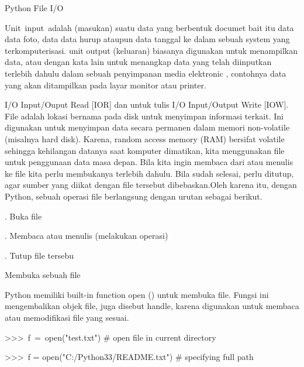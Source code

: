 \sloppy
\begin{center}{\fontsize{14pt}{14pt}\selectfont Python File I/O \\}\end{center} \par
Unit~input~adalah (masukan) suatu  data yang berbentuk documet bait itu data data foto, data data hurup ataupun data tanggal ke dalam sebuah system yang  terkomputerisasi.  unit output (keluaran) biasanya digunakan untuk menampilkan data, atau dengan kata lain untuk menangkap data yang telah diinputkan terlebih dahulu dalam sebuah penyimpanan media elektronic , contohnya data yang akan ditampilkan pada layar monitor atau printer. \par
I/O Input/Ouput Read [IOR] dan untuk tulis I/O Input/Output Write [IOW]. File adalah lokasi bernama pada disk untuk menyimpan informasi terkait. Ini digunakan untuk menyimpan data secara permanen dalam memori non-volatile (misalnya hard disk). Karena, random access memory (RAM) bersifat volatile sehingga kehilangan datanya saat komputer dimatikan, kita menggunakan file untuk penggunaan data masa depan. Bila kita ingin membaca dari atau menulis ke file kita perlu membukanya terlebih dahulu. Bila sudah selesai, perlu ditutup, agar sumber yang diikat dengan file tersebut dibebaskan.Oleh karena itu, dengan Python, sebuah operasi file berlangsung dengan urutan sebagai berikut. \par
\vspace{12pt}
. \hspace*{0.5in} Buka file \par
{}. \hspace*{0.5in} Membaca atau menulis (melakukan operasi) \par
{}. \hspace*{0.5in} Tutup file tersebu \par
\vspace{12pt}
\vspace{12pt}
\vspace{12pt}
\noindent 
Membuka sebuah file \par
\noindent 
Python memiliki built-in function open () untuk membuka file. Fungsi ini mengembalikan objek file, juga disebut handle, karena digunakan untuk membaca atau memodifikasi file yang sesuai. \par
\vspace{12pt}
\noindent 
>>>~f~=~open("test.txt")     $  \#  $ open file in current directory \par
\noindent 
>>>~f = open("C:/Python33/README.txt")   $  \#  $ specifying full path \par
